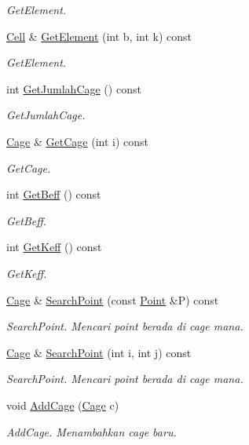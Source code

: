 \begin{DoxyCompactItemize}
\begin{DoxyCompactList}\small\item\em Get\+Element. \end{DoxyCompactList}\item 
\hyperlink{classCell}{Cell} \& \hyperlink{classZoo_a5d21cf8cb0acdc6d4c9b625699a1d4a9}{Get\+Element} (int b, int k) const 
\begin{DoxyCompactList}\small\item\em Get\+Element. \end{DoxyCompactList}\item 
int \hyperlink{classZoo_ae0465354e9418560540b516b8563a590}{Get\+Jumlah\+Cage} () const 
\begin{DoxyCompactList}\small\item\em Get\+Jumlah\+Cage. \end{DoxyCompactList}\item 
\hyperlink{classCage}{Cage} \& \hyperlink{classZoo_a3956c403bc9f854aba57146896d264ea}{Get\+Cage} (int i) const 
\begin{DoxyCompactList}\small\item\em Get\+Cage. \end{DoxyCompactList}\item 
int \hyperlink{classZoo_a21590932eb500dd07226c1bbe2ce4726}{Get\+Beff} () const 
\begin{DoxyCompactList}\small\item\em Get\+Beff. \end{DoxyCompactList}\item 
int \hyperlink{classZoo_a759d40e997b024236da2a503662dca88}{Get\+Keff} () const 
\begin{DoxyCompactList}\small\item\em Get\+Keff. \end{DoxyCompactList}\item 
\hyperlink{classCage}{Cage} \& \hyperlink{classZoo_a99470f6b1415873b4e5f8cd25b2cf5a6}{Search\+Point} (const \hyperlink{classPoint}{Point} \&P) const 
\begin{DoxyCompactList}\small\item\em Search\+Point. Mencari point berada di cage mana. \end{DoxyCompactList}\item 
\hyperlink{classCage}{Cage} \& \hyperlink{classZoo_a8a984fb1f2c3b513cf986dec67c287bf}{Search\+Point} (int i, int j) const 
\begin{DoxyCompactList}\small\item\em Search\+Point. Mencari point berada di cage mana. \end{DoxyCompactList}\item 
void \hyperlink{classZoo_ad6095030bd48a8f51b4f83ff13fdf3b2}{Add\+Cage} (\hyperlink{classCage}{Cage} c)
\begin{DoxyCompactList}\small\item\em Add\+Cage. Menambahkan cage baru. \end{DoxyCompactList}\end{DoxyCompactItemize}
